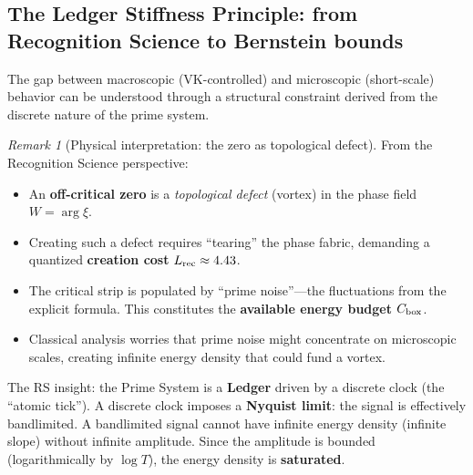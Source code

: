 \documentclass[11pt]{article}
\theoremstyle{definition}
\theoremstyle{remark}
\newtheorem{remark}[theorem]{Remark}
\theoremstyle{definition}
\begin{document}

\subsection*{The Ledger Stiffness Principle: from Recognition Science to Bernstein bounds}\label{sec:ledger-stiffness}

The gap between macroscopic (VK-controlled) and microscopic (short-scale) behavior can be understood through a structural constraint derived from the discrete nature of the prime system.

\begin{remark}[Physical interpretation: the zero as topological defect]\label{rem:zero-as-vortex}
From the Recognition Science perspective:
\begin{itemize}
\item An \textbf{off-critical zero} is a \emph{topological defect} (vortex) in the phase field $W = \arg \xi$.
\item Creating such a defect requires ``tearing'' the phase fabric, demanding a quantized \textbf{creation cost} $L_{\rm rec} \approx 4.43$.
\item The critical strip is populated by ``prime noise''---the fluctuations from the explicit formula. This constitutes the \textbf{available energy budget} $C_{\rm box}$.
\item Classical analysis worries that prime noise might concentrate on microscopic scales, creating infinite energy density that could fund a vortex.
\end{itemize}

The RS insight: the Prime System is a \textbf{Ledger} driven by a discrete clock (the ``atomic tick''). A discrete clock imposes a \textbf{Nyquist limit}: the signal is effectively bandlimited. A bandlimited signal cannot have infinite energy density (infinite slope) without infinite amplitude. Since the amplitude is bounded (logarithmically by $\log T$), the energy density is \textbf{saturated}.
\end{remark}
\end{document}
